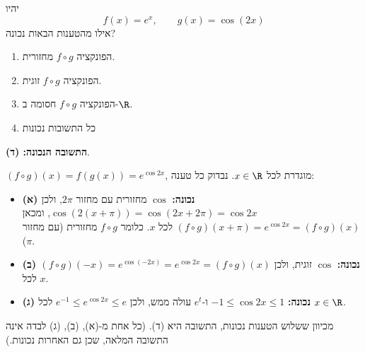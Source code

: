 
\begin{question}
יהיו
\[
f(x)=e^x,\qquad g(x)=\cos(2x)
\]
אילו מהטענות הבאות נכונה?
\begin{enumerate}
  \item הפונקציה $f\circ g$ מחזורית.
  \item הפונקציה $f\circ g$ זוגית.
  \item הפונקציה $f\circ g$ חסומה ב-$\R$.
  \item כל התשובות נכונות
\end{enumerate}
\end{question}

\begin{solution}
\textbf{התשובה הנכונה: (ד)}.

$(f\circ g)(x)=f(g(x))=e^{\cos 2x}$, מוגדרת לכל $x\in\R$. נבדוק כל טענה:
\begin{itemize}
  \item \textbf{(א) נכונה:} $\cos$ מחזורית עם מחזור $2\pi$, ולכן $\cos(2(x+\pi))=\cos(2x+2\pi)=\cos 2x$, ומכאן $(f\circ g)(x+\pi)=e^{\cos 2x}=(f\circ g)(x)$ לכל $x$. כלומר $f\circ g$ מחזורית (עם מחזור $\pi$).
  \item \textbf{(ב) נכונה:} $\cos$ זוגית, ולכן $(f\circ g)(-x)=e^{\cos(-2x)}=e^{\cos 2x}=(f\circ g)(x)$ לכל $x$.
  \item \textbf{(ג) נכונה:} $-1\le\cos 2x\le 1$ ו-$e^t$ עולה ממש, ולכן $e^{-1}\le e^{\cos 2x}\le e$ לכל $x\in\R$.
\end{itemize}
מכיוון ששלוש הטענות נכונות, התשובה היא (ד). (כל אחת מ-(א), (ב), (ג) לבדה אינה התשובה המלאה, שכן גם האחרות נכונות.)
\end{solution}
